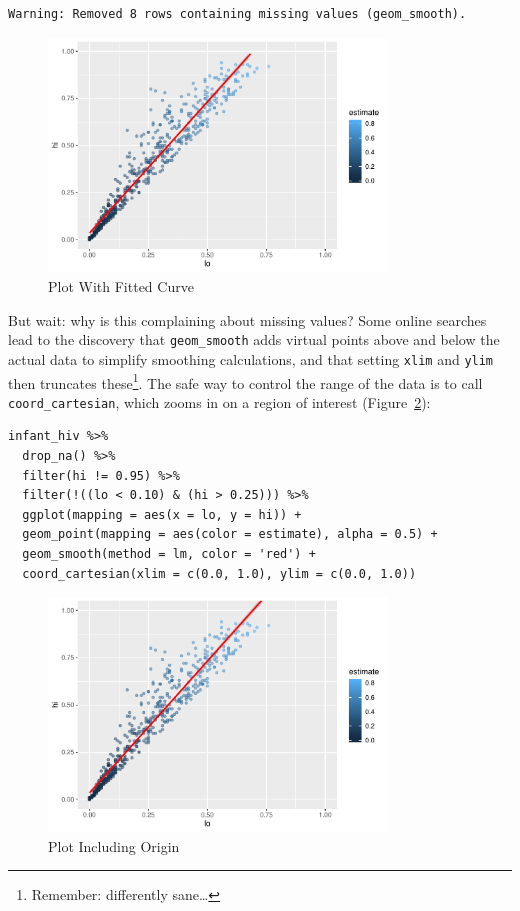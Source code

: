 \begin{lstlisting}
Warning: Removed 8 rows containing missing values (geom_smooth).
\end{lstlisting}

\begin{figure}[h]
  \includegraphics[width=0.8\textwidth]{figures/tidyverse/plot-with-fit-1.pdf}
  \caption{Plot With Fitted Curve}
  \label{fig:plot-with-fit}
\end{figure}

But wait:
why is this complaining about missing values?
Some online searches lead to the discovery that
\texttt{geom\_smooth} adds virtual points above and below the actual data to simplify smoothing calculations,
and that setting \texttt{xlim} and \texttt{ylim} then truncates these\footnote{Remember: differently sane{\ldots}}.
The safe way to control the range of the data is to call \texttt{coord\_cartesian},
which zooms in on a region of interest (Figure~\ref{fig:plot-cartesian}):

\begin{lstlisting}
infant_hiv %>%
  drop_na() %>%
  filter(hi != 0.95) %>%
  filter(!((lo < 0.10) & (hi > 0.25))) %>%
  ggplot(mapping = aes(x = lo, y = hi)) +
  geom_point(mapping = aes(color = estimate), alpha = 0.5) +
  geom_smooth(method = lm, color = 'red') +
  coord_cartesian(xlim = c(0.0, 1.0), ylim = c(0.0, 1.0))
\end{lstlisting}

\begin{figure}[h]
  \includegraphics[width=0.8\textwidth]{figures/tidyverse/plot-cartesian-1.pdf}
  \caption{Plot Including Origin}
  \label{fig:plot-cartesian}
\end{figure}

